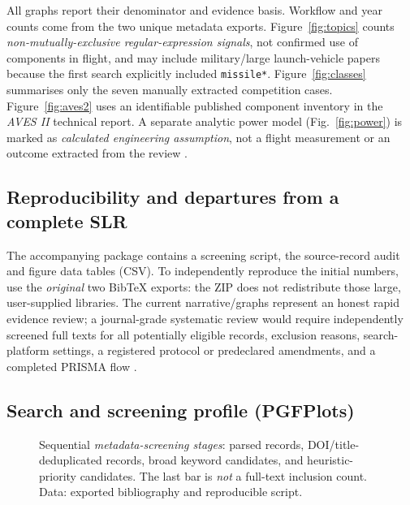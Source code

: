 \documentclass[10pt,a4paper]{article}
\begin{document}
All graphs report their denominator and evidence basis. Workflow and year counts come from the two unique metadata exports. Figure~\ref{fig:topics} counts \emph{non-mutually-exclusive regular-expression signals}, not confirmed use of components in flight, and may include military/large launch-vehicle papers because the first search explicitly included \texttt{missile*}. Figure~\ref{fig:classes} summarises only the seven manually extracted competition cases. Figure~\ref{fig:aves2} uses an identifiable published component inventory in the \emph{AVES II} technical report. A separate analytic power model (Fig.~\ref{fig:power}) is marked as \emph{calculated engineering assumption}, not a flight measurement or an outcome extracted from the review \cite{astg2022aves2,rpicopico,rtc2027rules}.

\subsection{Reproducibility and departures from a complete SLR}
The accompanying package contains a screening script, the source-record audit and figure data tables (CSV). To independently reproduce the initial numbers, use the \emph{original} two BibTeX exports: the ZIP does not redistribute those large, user-supplied libraries. The current narrative/graphs represent an honest rapid evidence review; a journal-grade systematic review would require independently screened full texts for all potentially eligible records, exclusion reasons, search-platform settings, a registered protocol or predeclared amendments, and a completed PRISMA flow \cite{page2021,rethlefsen2021}.

\subsection{Search and screening profile (PGFPlots)}
\begin{figure}[htbp]\centering
{}
\caption{Sequential \emph{metadata-screening stages}: parsed records, DOI/title-deduplicated records, broad keyword candidates, and heuristic-priority candidates. The last bar is \emph{not} a full-text inclusion count. Data: exported bibliography and reproducible script.}
\label{fig:screening}
\end{figure}
\end{document}
